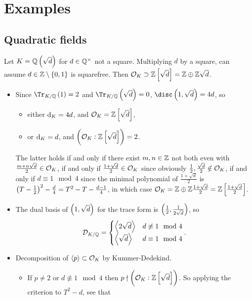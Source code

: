 \pagebreak

\section{Examples}

\subsection{Quadratic fields}


Let $ K = \QQ\br{\sqrt{d}} $ for $ d \in \mathbb{Q}^\times $ not a square. Multiplying $ d $ by a square, can assume $ d \in \ZZ \setminus \cbr{0, 1} $ is squarefree. Then $ \OOO_K \supset \ZZ\sbr{\sqrt{d}} = \ZZ \oplus \ZZ\sqrt{d} $.
\begin{itemize}
\item Since $ \Tr_{K / \QQ}\br{1} = 2 $ and $ \Tr_{K / \QQ}\br{\sqrt{d}} = 0 $, $ \disc \br{1, \sqrt{d}} = 4d $, so
\begin{itemize}
\item either $ \mathrm{d}_K = 4d $, and $ \OOO_K = \ZZ\sbr{\sqrt{d}} $,
\item or $ \mathrm{d}_K = d $, and $ \br{\OOO_K : \ZZ\sbr{\sqrt{d}}} = 2 $.
\end{itemize}
The latter holds if and only if there exist $ m, n \in \mathbb{Z} $ not both even with $ \tfrac{m + n\sqrt{d}}{2} \in \mathcal{O}_K $, if and only if $ \tfrac{1 + \sqrt{d}}{2} \in \mathcal{O}_K $ since obviously $ \tfrac{1}{2}, \tfrac{\sqrt{d}}{2} \notin \mathcal{O}_K $, if and only if $ d \equiv 1 \mod 4 $ since the minimal polynomial of $ \tfrac{1 + \sqrt{d}}{2} $ is $ \br{T - \tfrac{1}{2}}^2 - \tfrac{d}{4} = T^2 - T - \tfrac{d - 1}{4} $, in which case $ \OOO_K = \ZZ \oplus \ZZ\tfrac{1 + \sqrt{d}}{2} = \ZZ\sbr{\tfrac{1 + \sqrt{d}}{2}} $.
\item The dual basis of $ \br{1, \sqrt{d}} $ for the trace form is $ \br{\tfrac{1}{2}, \tfrac{1}{2\sqrt{d}}} $, so
$$ \mathcal{D}_{K / \mathbb{Q}} =
\begin{cases}
\left\langle 2\sqrt{d} \right\rangle & d \not\equiv 1 \mod 4 \\
\left\langle \sqrt{d} \right\rangle & d \equiv 1 \mod 4
\end{cases}.
$$
\item Decomposition of $ \left\langle p \right\rangle \subset \mathcal{O}_K $ by Kummer-Dedekind.
\begin{itemize}
\item If $ p \ne 2 $ or $ d \not\equiv 1 \mod 4 $ then $ p \nmid \br{\OOO_K : \ZZ\sbr{\sqrt{d}}} $. So applying the criterion to $ T^2 - d $, see that

\end{itemize}
\end{itemize}

